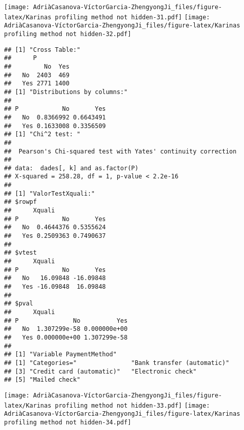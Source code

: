 \documentclass[
]{article}
\begin{document}
\texttt{[image: AdriàCasanova-VíctorGarcia-ZhengyongJi\_files/figure-latex/Karinas profiling method not hidden-31.pdf]}
\texttt{[image: AdriàCasanova-VíctorGarcia-ZhengyongJi\_files/figure-latex/Karinas profiling method not hidden-32.pdf]}

\begin{verbatim}
## [1] "Cross Table:"
##      P
##         No  Yes
##   No  2403  469
##   Yes 2771 1400
## [1] "Distributions by columns:"
##      
## P            No       Yes
##   No  0.8366992 0.6643491
##   Yes 0.1633008 0.3356509
## [1] "Chi^2 test: "
## 
##  Pearson's Chi-squared test with Yates' continuity correction
## 
## data:  dades[, k] and as.factor(P)
## X-squared = 258.28, df = 1, p-value < 2.2e-16
## 
## [1] "ValorTestXquali:"
## $rowpf
##      Xquali
## P            No       Yes
##   No  0.4644376 0.5355624
##   Yes 0.2509363 0.7490637
## 
## $vtest
##      Xquali
## P            No       Yes
##   No   16.09848 -16.09848
##   Yes -16.09848  16.09848
## 
## $pval
##      Xquali
## P               No          Yes
##   No  1.307299e-58 0.000000e+00
##   Yes 0.000000e+00 1.307299e-58
## 
## [1] "Variable PaymentMethod"
## [1] "Categories="               "Bank transfer (automatic)"
## [3] "Credit card (automatic)"   "Electronic check"         
## [5] "Mailed check"
\end{verbatim}

\texttt{[image: AdriàCasanova-VíctorGarcia-ZhengyongJi\_files/figure-latex/Karinas profiling method not hidden-33.pdf]}
\texttt{[image: AdriàCasanova-VíctorGarcia-ZhengyongJi\_files/figure-latex/Karinas profiling method not hidden-34.pdf]}
\end{document}
